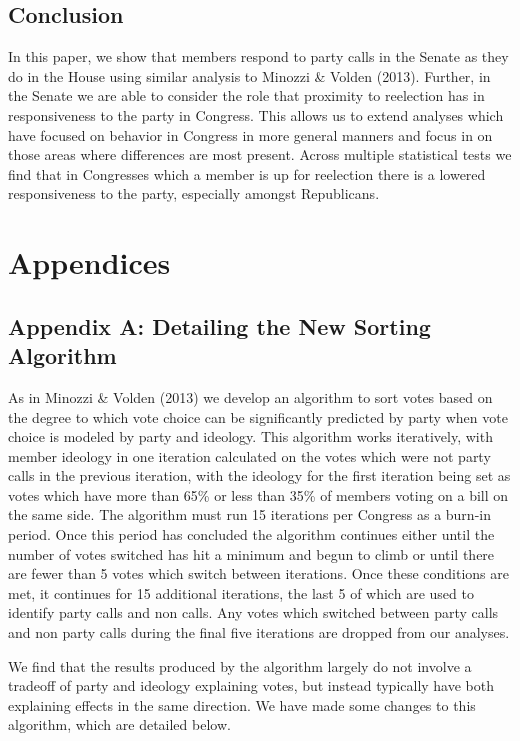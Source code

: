 \documentclass[12pt]{article}
\begin{document}
\subsection{Conclusion}

In this paper, we show that members respond to party calls in the Senate as they do in the House using similar analysis to Minozzi \& Volden (2013). Further, in the Senate we are able to consider the role that proximity to reelection has in responsiveness to the party in Congress. This allows us to extend analyses which have focused on behavior in Congress in more general manners and focus in on those areas where differences are most present. Across multiple statistical tests we find that in Congresses which a member is up for reelection there is a lowered responsiveness to the party, especially amongst Republicans.

\pagebreak

\section{Appendices}

\subsection{Appendix A: Detailing the New Sorting Algorithm}

As in Minozzi \& Volden (2013) we develop an algorithm to sort votes based on the degree to which vote choice can be significantly predicted by party when vote choice is modeled by party and ideology. This algorithm works iteratively, with member ideology in one iteration calculated on the votes which were not party calls in the previous iteration, with the ideology for the first iteration being set as votes which have more than 65\% or less than 35\% of members voting on a bill on the same side. The algorithm must run 15 iterations per Congress as a burn-in period. Once this period has concluded the algorithm continues either until the number of votes switched has hit a minimum and begun to climb or until there are fewer than 5 votes which switch between iterations. Once these conditions are met, it continues for 15 additional iterations, the last 5 of which are used to identify party calls and non calls. Any votes which switched between party calls and non party calls during the final five iterations are dropped from our analyses.

We find that the results produced by the algorithm largely do not involve a tradeoff of party and ideology explaining votes, but instead typically have both explaining effects in the same direction. We have made some changes to this algorithm, which are detailed below.
\end{document}
